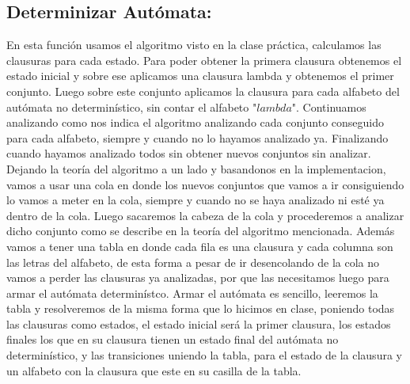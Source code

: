 \subsection{Determinizar Autómata:}
En esta función usamos el algoritmo visto en la clase práctica, calculamos las clausuras para cada estado.\newline
Para poder obtener la primera clausura obtenemos el estado inicial y sobre ese aplicamos una clausura lambda y obtenemos el primer conjunto. Luego sobre este conjunto aplicamos la clausura para cada alfabeto del autómata no determinístico, sin contar el alfabeto "$lambda$".\newline
Continuamos analizando como nos indica el algoritmo analizando cada conjunto conseguido para cada alfabeto, siempre y cuando no lo hayamos analizado ya.
Finalizando cuando hayamos analizado todos sin obtener nuevos conjuntos sin analizar.\newline
Dejando la teoría del algoritmo a un lado y basandonos en la implementacion, vamos a usar una cola en donde los nuevos conjuntos que vamos a ir consiguiendo lo vamos a meter en la cola, siempre y cuando no se haya analizado ni esté ya dentro de la cola. Luego sacaremos la cabeza de la cola y procederemos a analizar dicho conjunto como se describe en la teoría del algoritmo mencionada.\newline
Además vamos a tener una tabla en donde cada fila es una clausura y cada columna son las letras del alfabeto, de esta forma a pesar de ir desencolando de la cola no vamos a perder las clausuras ya analizadas, por que las necesitamos luego para armar el autómata determinístco. Armar el autómata es sencillo, leeremos la tabla y resolveremos de la misma forma que lo hicimos en clase, poniendo todas las clausuras como estados, el estado inicial será la primer clausura, los estados finales los que en su clausura tienen un estado final del autómata no determinístico, y las transiciones uniendo la tabla, para el estado de la clausura y un alfabeto con la clausura que este en su casilla de la tabla.

